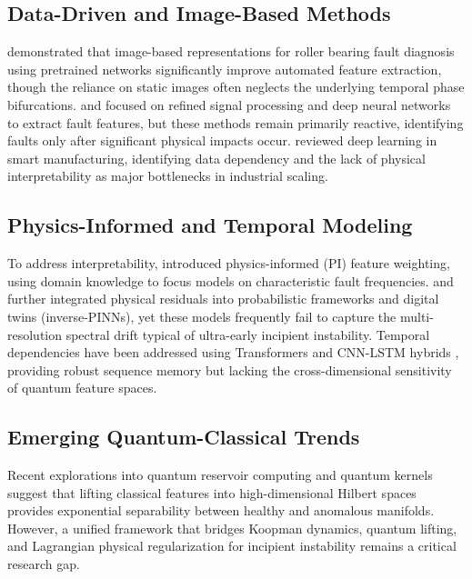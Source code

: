 \documentclass[a4paper,fleqn]{cas-dc}
\begin{document}
\subsection{Data-Driven and Image-Based Methods}
\cite{sugumaran2025comparative} demonstrated that image-based representations for roller bearing fault diagnosis using pretrained networks significantly improve automated feature extraction, though the reliance on static images often neglects the underlying temporal phase bifurcations. \cite{thangamuthu2022bearing} and \cite{rao2022development} focused on refined signal processing and deep neural networks to extract fault features, but these methods remain primarily reactive, identifying faults only after significant physical impacts occur. \cite{zhao2021deep} reviewed deep learning in smart manufacturing, identifying data dependency and the lack of physical interpretability as major bottlenecks in industrial scaling.

\subsection{Physics-Informed and Temporal Modeling}
To address interpretability, \cite{chen2023physics} introduced physics-informed (PI) feature weighting, using domain knowledge to focus models on characteristic fault frequencies. \cite{liu2024physics} and \cite{wang2024inverse} further integrated physical residuals into probabilistic frameworks and digital twins (inverse-PINNs), yet these models frequently fail to capture the multi-resolution spectral drift typical of ultra-early incipient instability. Temporal dependencies have been addressed using Transformers \cite{zhang2023transformer} and CNN-LSTM hybrids \cite{thangamuthu2025cnn}, providing robust sequence memory but lacking the cross-dimensional sensitivity of quantum feature spaces.

\subsection{Emerging Quantum-Classical Trends}
Recent explorations into quantum reservoir computing \cite{smith2024quantum} and quantum kernels \cite{wu2024quantum} suggest that lifting classical features into high-dimensional Hilbert spaces provides exponential separability between healthy and anomalous manifolds. However, a unified framework that bridges Koopman dynamics, quantum lifting, and Lagrangian physical regularization for incipient instability remains a critical research gap.
\end{document}
